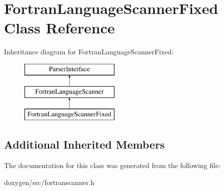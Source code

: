 \hypertarget{class_fortran_language_scanner_fixed}{}\section{Fortran\+Language\+Scanner\+Fixed Class Reference}
\label{class_fortran_language_scanner_fixed}
Inheritance diagram for Fortran\+Language\+Scanner\+Fixed\+:\begin{figure}[H]
\begin{center}
\leavevmode
\includegraphics[height=3.000000cm]{class_fortran_language_scanner_fixed}
\end{center}
\end{figure}
\subsection*{Additional Inherited Members}


The documentation for this class was generated from the following file\+:\begin{DoxyCompactItemize}
\item 
doxygen/src/fortranscanner.\+h\end{DoxyCompactItemize}
